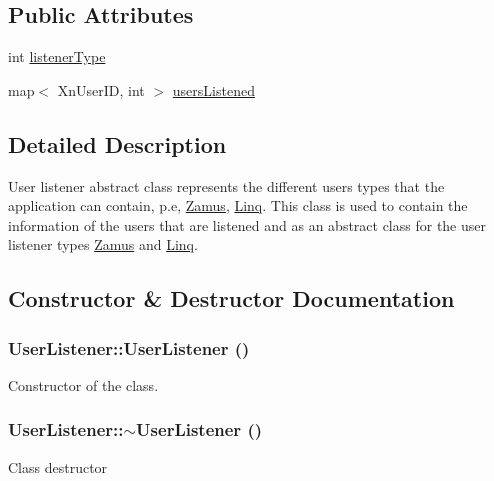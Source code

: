 \subsection*{Public Attributes}
\begin{DoxyCompactItemize}
\item 
int \hyperlink{classUserListener_a97d89eef39e5c96b3d94582aad460cfe}{listenerType}
\item 
map$<$ XnUserID, int $>$ \hyperlink{classUserListener_ad061c4f8f4041c730b4b1f14a11b288a}{usersListened}
\end{DoxyCompactItemize}


\subsection{Detailed Description}
User listener abstract class represents the different users types that the application can contain, p.e, \hyperlink{classZamus}{Zamus}, \hyperlink{classLinq}{Linq}. This class is used to contain the information of the users that are listened and as an abstract class for the user listener types \hyperlink{classZamus}{Zamus} and \hyperlink{classLinq}{Linq}. 

\subsection{Constructor \& Destructor Documentation}
\hypertarget{classUserListener_a593567c1539186c1b3e5781be52bfd80}{
\subsubsection[{UserListener}]{\setlength{\rightskip}{0pt plus 5cm}UserListener::UserListener ()}}
\label{classUserListener_a593567c1539186c1b3e5781be52bfd80}
Constructor of the class. \hypertarget{classUserListener_abca800235b1afb94a98e28412e971a9e}{
\subsubsection[{$\sim$UserListener}]{\setlength{\rightskip}{0pt plus 5cm}UserListener::$\sim$UserListener ()}}
\label{classUserListener_abca800235b1afb94a98e28412e971a9e}
Class destructor 

